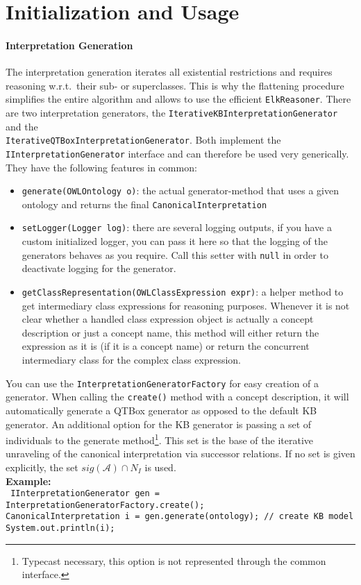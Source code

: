 \documentclass{article}
\begin{document}
\section{Initialization and Usage}

\paragraph{Interpretation Generation}
The interpretation generation iterates all existential restrictions and requires
reasoning w.r.t.\ their sub- or superclasses. This is why the flattening
procedure simplifies the entire algorithm and allows to use the efficient
\texttt{ElkReasoner}. There are two interpretation generators, the
\texttt{IterativeKBInterpretationGenerator} and the\\
\texttt{IterativeQTBoxInterpretationGenerator}. Both implement the\\
\texttt{IInterpretationGenerator} interface and can therefore be used very
generically. They have the following features in common:
\begin{itemize}
  \item \texttt{generate(OWLOntology o)}: the actual generator-method that uses
  a given ontology and returns the final \texttt{CanonicalInterpretation}
  \item \texttt{setLogger(Logger log)}: there are several logging outputs, if
  you have a custom initialized logger, you can pass it here so that the logging
  of the generators behaves as you require. Call this setter with \texttt{null}
  in order to deactivate logging for the generator.
  \item \texttt{getClassRepresentation(OWLClassExpression expr)}: a helper
  method to get intermediary class expressions for reasoning purposes. Whenever
  it is not clear whether a handled class expression object is actually a
  concept description or just a concept name, this method will either return the
  expression as it is (if it is a concept name) or return the concurrent
  intermediary class for the complex class expression.
\end{itemize}

You can use the \texttt{InterpretationGeneratorFactory} for easy creation of a
generator. When calling the \texttt{create()} method with a concept
description, it will automatically generate a QTBox generator as opposed to the
default KB generator.
An additional option for the KB generator is passing a set of individuals to the generate
method\footnote{Typecast necessary, this option is not represented through the
common interface.}.
This set is the base of the iterative unraveling of the canonical interpretation via successor relations. If no set is given explicitly, the set
$sig(\mathcal{A}) \cap N_I$ is used.\\
\textbf{Example:}\\
\texttt{
IInterpretationGenerator gen = InterpretationGeneratorFactory.create();\\
CanonicalInterpretation i = gen.generate(ontology); // create KB model\\
System.out.println(i);
}
\end{document}
